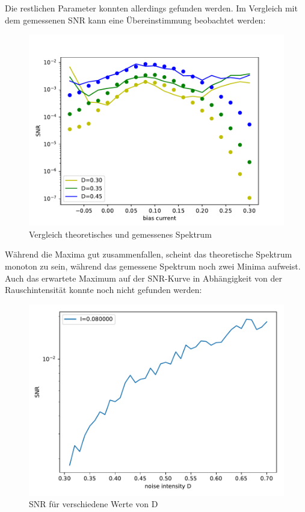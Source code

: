 \documentclass[12pt,a4paper]{article}
\begin{document}
Die restlichen Parameter konnten allerdings gefunden werden. Im Vergleich mit dem gemessenen SNR kann eine Übereinstimmung beobachtet werden:
\begin{figure}[H]
	\centering
	\includegraphics[scale=0.9]{snrangerealana.pdf}
	\caption{Vergleich theoretisches und gemessenes Spektrum}
	\label{deltaspectrum}
\end{figure}
Während die Maxima gut zusammenfallen, scheint das theoretische Spektrum monoton zu sein, während das gemessene Spektrum noch zwei Minima aufweist. \\
Auch das erwartete Maximum auf der SNR-Kurve in Abhängigkeit von der Rauschintensität konnte noch nicht gefunden werden:
\begin{figure}[H]
	\centering
	\includegraphics[scale=0.9]{snrautoabgrealdrange6aem2.pdf}
	\caption{SNR für verschiedene Werte von D}
	\label{drange}
\end{figure}
\end{document}

